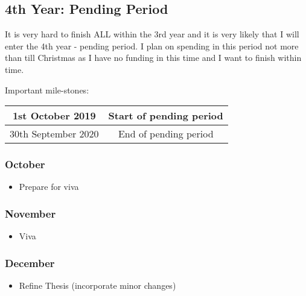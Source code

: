 \subsection{4th Year: Pending Period}
It is very hard to finish ALL within the 3rd year and it is very likely that I will enter the 4th year - pending period. I plan on spending in this period not more than till Christmas as I have no funding in this time and I want to finish within time.

Important mile-stones:

\begin{center}
\begin{tabular}{ c|c } 
	1st October 2019 & Start of pending period \\
	\hline
	30th September 2020 & End of pending period \\ 
\end{tabular}
\end{center}

\subsubsection{October}
\begin{itemize}
	\item Prepare for viva
\end{itemize}

\subsubsection{November}
\begin{itemize}
	\item Viva
\end{itemize}

\subsubsection{December}
\begin{itemize}
	\item Refine Thesis (incorporate minor changes)
\end{itemize}